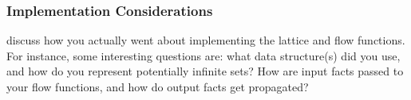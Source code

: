 \documentclass{article}
\theoremstyle{definition}
\begin{document}
\subsubsection{Implementation Considerations}
\begin{framed}
  discuss how you actually went about implementing the lattice and
  flow functions. For instance, some interesting questions are: what
  data structure(s) did you use, and how do you represent potentially
  infinite sets? How are input facts passed to your flow functions,
  and how do output facts get propagated?
\end{framed}
\end{document}
